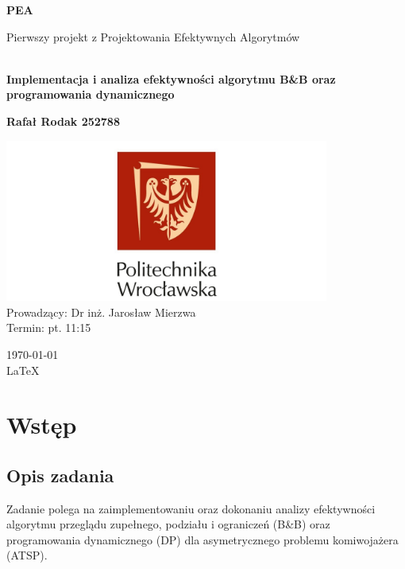 \documentclass[a4paper,12pt]{article}
\begin{document}
\begin{titlepage}
    
    \centering
    {\huge\bfseries PEA\par}
    
    \vspace{0.9cm}
    Pierwszy projekt z Projektowania Efektywnych Algorytmów
    \vspace{1cm}
    {\Large \bfseries \\Implementacja i analiza efektywności algorytmu B\&B oraz programowania dynamicznego\par}
    \vspace{3cm}
    {\large\bfseries Rafał Rodak 252788\par}
    \vspace{0.15cm}

    \vfill

    \includegraphics[width=0.8\textwidth]{logo.png}
    \vspace{1.2cm}
    \\Prowadzący: Dr inż. Jarosław Mierzwa \\
    Termin: pt. 11:15


    \vspace{1cm}
    \today \\ \LaTeX
    
    \restoregeometry
\end{titlepage}

\tableofcontents
\pagebreak
 
\section{Wstęp}
\subsection{Opis zadania}

Zadanie polega na zaimplementowaniu oraz dokonaniu analizy efektywności algorytmu 
przeglądu zupełnego, podziału i ograniczeń (B\&B) oraz programowania dynamicznego 
(DP) dla asymetrycznego problemu komiwojażera (ATSP).\\
\end{document}
